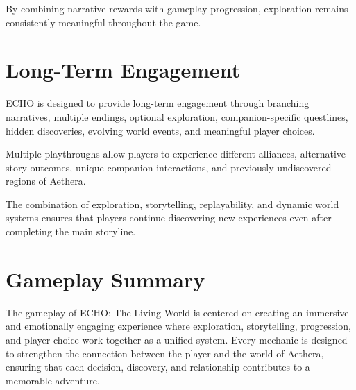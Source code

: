 By combining narrative rewards with gameplay progression, exploration remains consistently meaningful throughout the game.

\section{Long-Term Engagement}

ECHO is designed to provide long-term engagement through branching narratives, multiple endings, optional exploration, companion-specific questlines, hidden discoveries, evolving world events, and meaningful player choices.

Multiple playthroughs allow players to experience different alliances, alternative story outcomes, unique companion interactions, and previously undiscovered regions of Aethera.

The combination of exploration, storytelling, replayability, and dynamic world systems ensures that players continue discovering new experiences even after completing the main storyline.

\section{Gameplay Summary}

The gameplay of ECHO: The Living World is centered on creating an immersive and emotionally engaging experience where exploration, storytelling, progression, and player choice work together as a unified system. Every mechanic is designed to strengthen the connection between the player and the world of Aethera, ensuring that each decision, discovery, and relationship contributes to a memorable adventure.